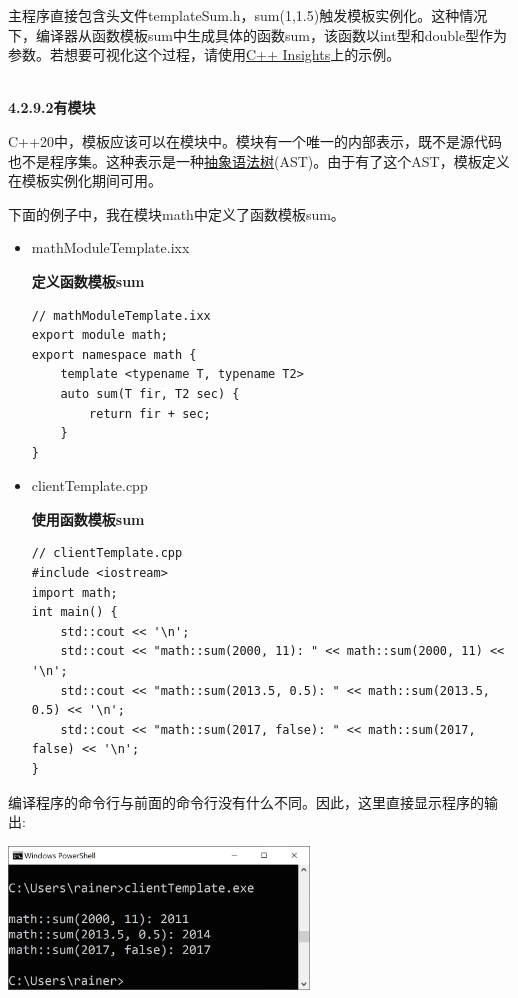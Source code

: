 主程序直接包含头文件templateSum.h，sum(1,1.5)触发模板实例化。这种情况下，编译器从函数模板sum中生成具体的函数sum，该函数以int型和double型作为参数。若想要可视化这个过程，请使用\href{https://cppinsights.io/}{C++ Insights}上的示例。

\hspace*{\fill} \\ %
\noindent
\textbf{4.2.9.2\hspace{0.2cm}有模块}

C++20中，模板应该可以在模块中。模块有一个唯一的内部表示，既不是源代码也不是程序集。这种表示是一种\href{https://en.wikipedia.org/wiki/Abstract_syntax_tree}{抽象语法树}(AST)。由于有了这个AST，模板定义在模板实例化期间可用。

下面的例子中，我在模块math中定义了函数模板sum。

\begin{itemize}
\item 
mathModuleTemplate.ixx

\noindent
\textbf{定义函数模板sum}
\begin{lstlisting}[style=styleCXX]
// mathModuleTemplate.ixx
export module math;
export namespace math {
	template <typename T, typename T2>
	auto sum(T fir, T2 sec) {
		return fir + sec;
	}
}
\end{lstlisting}

\item 
clientTemplate.cpp

\noindent
\textbf{使用函数模板sum}
\begin{lstlisting}[style=styleCXX]
// clientTemplate.cpp
#include <iostream>
import math;
int main() {
	std::cout << '\n';
	std::cout << "math::sum(2000, 11): " << math::sum(2000, 11) << '\n';
	std::cout << "math::sum(2013.5, 0.5): " << math::sum(2013.5, 0.5) << '\n';
	std::cout << "math::sum(2017, false): " << math::sum(2017, false) << '\n';
}
\end{lstlisting}
\end{itemize}

编译程序的命令行与前面的命令行没有什么不同。因此，这里直接显示程序的输出:

\begin{center}
\includegraphics[width=0.6\textwidth]{content/3/chapter4/images/24.png}\\
\end{center}

